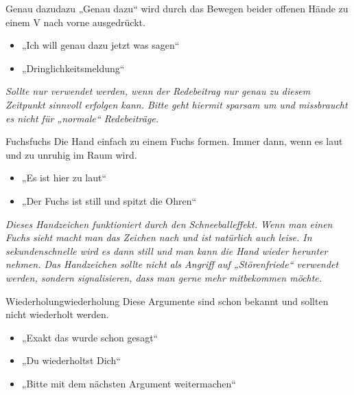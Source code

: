 \begin{handzeichen}{Genau dazu}{dazu} %
„Genau dazu“ wird durch das Bewegen beider offenen Hände zu einem V nach vorne
ausgedrückt.
\begin{itemize}
	\item „Ich will genau dazu jetzt was sagen“
	\item „Dringlichkeitsmeldung“
\end{itemize}
\end{handzeichen}

\emph{Sollte nur verwendet werden, wenn der Redebeitrag nur genau zu diesem
Zeitpunkt sinnvoll erfolgen kann. Bitte geht hiermit sparsam um und missbraucht
es nicht für „normale“ Redebeiträge.}

\begin{handzeichen}[.2\linewidth]{Fuchs}{fuchs} %
Die Hand einfach zu einem Fuchs formen. Immer dann, wenn es laut und zu unruhig
im Raum wird.
\begin{itemize}
	\item „Es ist hier zu laut“
	\item „Der Fuchs ist still und spitzt die Ohren“
\end{itemize}
\end{handzeichen}

\emph{Dieses Handzeichen funktioniert durch den Schneeballeffekt. Wenn man
einen Fuchs sieht macht man das Zeichen nach und ist natürlich auch leise. In
sekundenschnelle wird es dann still und man kann die Hand wieder herunter
nehmen. Das Handzeichen sollte nicht als Angriff auf „Störenfriede“ verwendet
werden, sondern signalisieren, dass man gerne mehr mitbekommen möchte.}

\begin{handzeichen}{Wiederholung}{wiederholung}
Diese Argumente sind schon bekannt und sollten nicht wiederholt werden.
\begin{itemize}
	\item „Exakt das wurde schon gesagt“
	\item „Du wiederholtst Dich“
	\item „Bitte mit dem nächsten Argument weitermachen“
\end{itemize}
\end{handzeichen}
